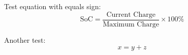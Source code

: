\documentclass{article}
\begin{document}
Test equation with equals sign:
\begin{equation}
\text{SoC} = \frac{\text{Current Charge}}{\text{Maximum Charge}} \times 100\%
\end{equation}

Another test:
\begin{equation}
x = y + z
\end{equation}
\end{document}

